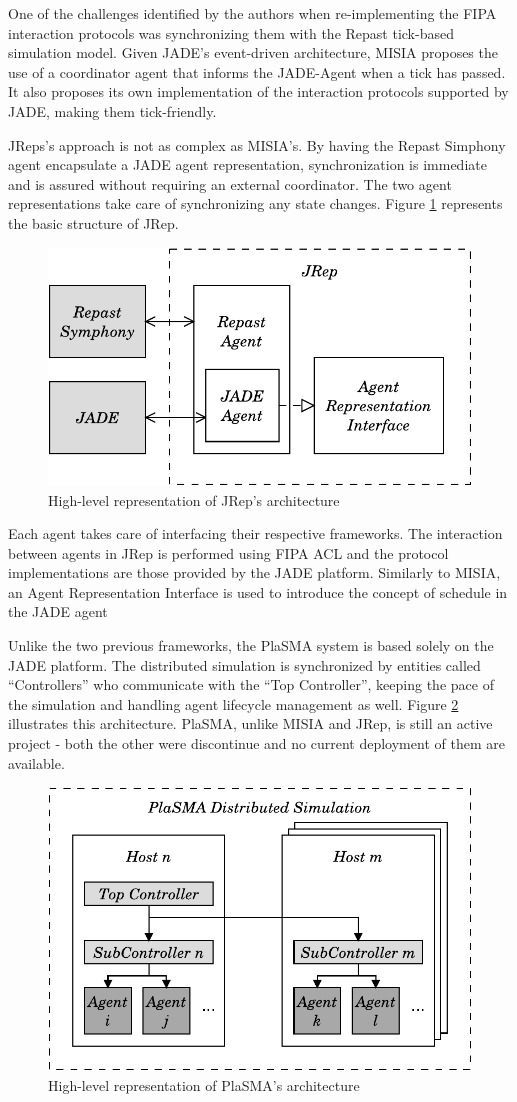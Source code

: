 One of the challenges identified by the authors when re-implementing the FIPA interaction protocols was synchronizing them with the Repast tick-based simulation model. Given JADE's event-driven architecture, MISIA proposes the use of a coordinator agent that informs the JADE-Agent when a tick has passed. It also proposes its own implementation of the interaction protocols supported by JADE, making them tick-friendly.

JReps's approach is not as complex as MISIA's.
By having the Repast Simphony agent encapsulate a JADE agent representation, synchronization is immediate and is assured without requiring an external coordinator.
The two agent representations take care of synchronizing any state changes.
Figure \ref{fig:jrep} represents the basic structure of JRep.

\begin{figure}[h]
	\centering
	\includegraphics[width=0.5\linewidth]{figures/jrep.pdf}
	\caption{High-level representation of JRep's architecture}
	\label{fig:jrep}
\end{figure}

Each agent takes care of interfacing their respective frameworks. The interaction between agents in JRep is performed using FIPA ACL and the protocol implementations are those provided by the JADE platform. Similarly to MISIA, an Agent Representation Interface is used to introduce the concept of schedule in the JADE agent

Unlike the two previous frameworks, the PlaSMA system is based solely on the JADE platform. The distributed simulation is synchronized by entities called ``Controllers'' who communicate with the ``Top Controller'', keeping the pace of the simulation and handling agent lifecycle management as well. Figure \ref{fig:plasma} illustrates this architecture. PlaSMA, unlike MISIA and JRep, is still an active project - both the other were discontinue and no current deployment of them are available.

\begin{figure}[h]
	\centering
	\includegraphics[width=0.5\linewidth]{figures/PlaSMA.pdf}
	\caption{High-level representation of PlaSMA's architecture}
	\label{fig:plasma}
\end{figure}

